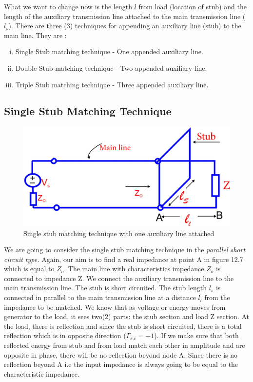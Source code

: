 \begin{enumerate}[(i)]
What we want to change now is the length $l$ from load (location of stub) and the length of the auxiliary transmission line attached to the main transmission line ($l_s$). There are three (3) techniques for appending an auxiliary line (stub) to the main line. They are :
\begin{enumerate}[(i)]
\item Single Stub matching technique - One appended auxiliary line.
\item Double Stub matching technique - Two appended auxiliary line.
\item Triple Stub matching technique - Three appended auxiliary line.  
\end{enumerate} 
\subsection{Single Stub Matching Technique }
\begin{figure}[h]
\centering
\includegraphics[width=1\linewidth]{./graphics/fig11}
\caption{Single stub matching technique with one auxiliary line attached}
\end{figure}

We are going to consider the single stub matching technique in the\textit{ parallel short circuit type.} Again, our aim is to find a real impedance at point A in figure 12.7 which is equal to $Z_o$. The main line with characteristics impedance $ Z_o$ is connected to impedance Z. We connect the auxiliary transmission line to the main transmission line. The stub is short circuited. The stub length $l_s$ is connected in parallel to the main transmission line at a distance $ l_l$ from the impedance to be matched. We know that as voltage or energy moves from generator to the load, it sees two(2) parts: the stub section and load Z section. At the load, there is  reflection and since the stub is short circuited, there is a total reflection which is in opposite direction ($\Gamma_{s.c} = -1$). If we make sure that both reflected energy from stub and  from load match each other in amplitude and are opposite in phase, there will be no reflection beyond node A. Since there is no reflection beyond A i.e the input impedance is always going to be equal to the characteristic impedance.\\


\end{enumerate}
